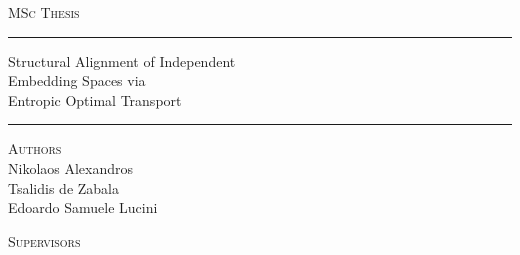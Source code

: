 \begin{titlepage}

  \noindent
  \begin{minipage}[t]{0.6\textwidth}
    \raggedright
    {\small\scshape\color{gray} \thesisInstitution}
  \end{minipage}
  \hfill
  \begin{minipage}[t]{0.35\textwidth}
    \raggedleft
    {\small\scshape\color{gray} MSc Thesis \textbullet\ \thesisDate}
  \end{minipage}

  \vspace*{0.12\textheight}

  \noindent\rule{\textwidth}{0.4pt}
  \vspace{0.5em}

  \noindent
  {\fontsize{26}{30}\selectfont\bfseries\raggedright
    Structural Alignment of Independent\\
    Embedding Spaces via\\
    Entropic Optimal Transport
  \par}

  \vspace{0.4em}
  \noindent\rule{\textwidth}{0.4pt}

  \vspace{2.5em}

  \noindent
  \begin{minipage}[t]{0.48\textwidth}
    \raggedright
    {\small\scshape\color{gray} Authors}\\[0.4em]
    {\normalsize Nikolaos Alexandros\\Tsalidis de Zabala}\\[0.8em]
    {\normalsize Edoardo Samuele Lucini}
  \end{minipage}
  \hfill
  \begin{minipage}[t]{0.48\textwidth}
    \raggedright
    {\small\scshape\color{gray} Supervisors}\\[0.4em]
    {\normalsize \thesisSupervisor}\\[0.8em]
    {\normalsize \thesisCoSupervisor}
  \end{minipage}

  \vfill

  \noindent
  \begin{minipage}[b]{0.5\textwidth}
    \raggedright
    {\small\color{gray} \thesisInstitution}
  \end{minipage}
  \hfill
  \begin{minipage}[b]{0.4\textwidth}
    \raggedleft
    {\small\color{gray} \thesisDate}
  \end{minipage}

  \restoregeometry
\end{titlepage}